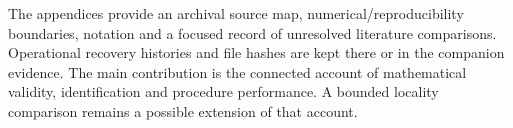 The appendices provide an archival source map, numerical/reproducibility boundaries, notation and a focused record of unresolved literature comparisons. Operational recovery histories and file hashes are kept there or in the companion evidence. The main contribution is the connected account of mathematical validity, identification and procedure performance. A bounded locality comparison remains a possible extension of that account.
